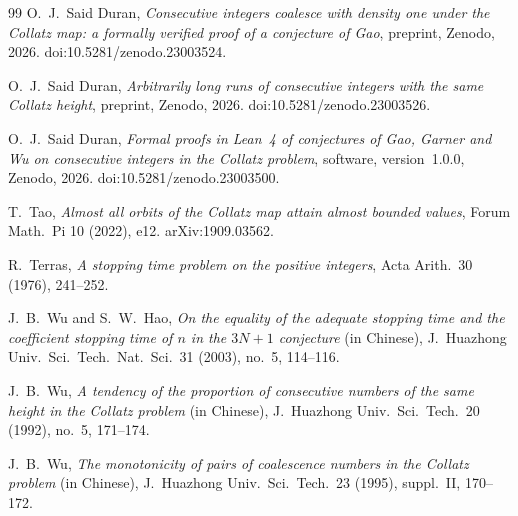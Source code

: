 \documentclass[11pt]{amsart}
\theoremstyle{definition}
\theoremstyle{remark}
\begin{document}
\begin{thebibliography}{99}
 O.~J.~Said Duran, \emph{Consecutive integers coalesce with density one under the Collatz map: a formally verified proof of a conjecture of Gao}, preprint, Zenodo, 2026. doi:10.5281/zenodo.23003524.

 O.~J.~Said Duran, \emph{Arbitrarily long runs of consecutive integers with the same Collatz height}, preprint, Zenodo, 2026. doi:10.5281/zenodo.23003526.

 O.~J.~Said Duran, \emph{Formal proofs in Lean~4 of conjectures of Gao, Garner and Wu on consecutive integers in the Collatz problem}, software, version~1.0.0, Zenodo, 2026. doi:10.5281/zenodo.23003500.

 T.~Tao, \emph{Almost all orbits of the Collatz map attain almost bounded values}, Forum Math.\ Pi 10 (2022), e12. arXiv:1909.03562.

 R.~Terras, \emph{A stopping time problem on the positive integers}, Acta Arith.\ 30 (1976), 241--252.

 J.~B.~Wu and S.~W.~Hao, \emph{On the equality of the adequate stopping time and the coefficient stopping time of $n$ in the $3N+1$ conjecture} (in Chinese), J.~Huazhong Univ.\ Sci.\ Tech.\ Nat.\ Sci.\ 31 (2003), no.~5, 114--116.

 J.~B.~Wu, \emph{A tendency of the proportion of consecutive numbers of the same height in the Collatz problem} (in Chinese), J.~Huazhong Univ.\ Sci.\ Tech.\ 20 (1992), no.~5, 171--174.

 J.~B.~Wu, \emph{The monotonicity of pairs of coalescence numbers in the Collatz problem} (in Chinese), J.~Huazhong Univ.\ Sci.\ Tech.\ 23 (1995), suppl.~II, 170--172.

\end{thebibliography}
\end{document}

